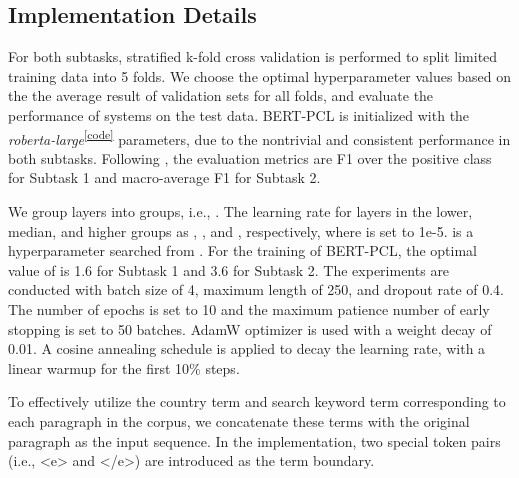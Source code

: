 \documentclass[11pt]{article}
\begin{document}
\subsection{Implementation Details}
For both subtasks, stratified k-fold cross validation  \citep{DBLP:conf/ijcai/Kohavi95,DBLP:conf/pkdd/SechidisTV11} is performed to split limited training data into 5 folds.
We choose the optimal hyperparameter values based on the the average result of validation sets for all folds, and evaluate the performance of systems on the test data.
BERT-PCL is initialized with the \textit{roberta-large}\textsuperscript{\ref{code}} parameters, due to the nontrivial and consistent performance in both subtasks. Following \citet{perez2020don,perezalmendros2022semeval}, the evaluation metrics are F1 over the positive class for Subtask 1 and macro-average F1 for Subtask 2.


We group layers into  groups, i.e., . 
The learning rate for layers in the lower, median, and higher groups as , , and , respectively, where  is set to 1e-5.  is a hyperparameter searched from . 
For the training of BERT-PCL, the optimal value of  is 1.6 for Subtask 1 and 3.6 for Subtask 2.
The experiments are conducted with batch size of 4, maximum length of 250, and dropout rate of 0.4. The number of epochs is set to 10 and the maximum patience number of early stopping is set to 50 batches. 
AdamW optimizer \citep{DBLP:journals/corr/KingmaB14} is used with a weight decay of 0.01.
A cosine annealing schedule \citep{DBLP:conf/iclr/LoshchilovH17} is applied to decay the learning rate, with a linear warmup for the first 10\% steps.

To effectively utilize the country term and search keyword term corresponding to each paragraph in the corpus, we concatenate these terms with the original paragraph as the input sequence. In the implementation, two special token pairs (i.e., <e> and </e>) are introduced as the term boundary.
\end{document}
